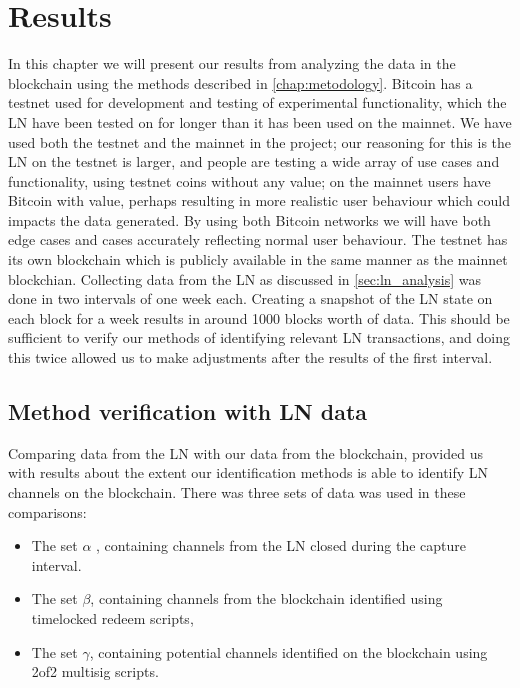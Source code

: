 \chapter{Results}
\label{chap:results}

In this chapter we will present our results from analyzing the data in the blockchain using the methods described in \cref{chap:metodology}. 
Bitcoin has a testnet used for development and testing of experimental functionality, which the LN have been tested on for longer than it has been used on the mainnet. We have used both the testnet and the mainnet in the project; our reasoning for this is the LN on the testnet is larger, and people are testing a wide array of use cases and functionality, using testnet coins without any value; on the mainnet users have Bitcoin with value, perhaps resulting in more realistic user behaviour which could impacts the data generated.
By using both Bitcoin networks we will have both edge cases and cases accurately reflecting normal user behaviour.
The testnet has its own blockchain which is publicly available in the same manner as the mainnet blockchian. Collecting data from the LN as discussed in \cref{sec:ln_analysis} was done in two intervals of one week each.
Creating a snapshot of the LN state on each block for a week results in around 1000 blocks worth of data. This should be sufficient to verify our methods of identifying relevant LN transactions, and doing this twice allowed us to make adjustments after the results of the first interval. 

\section{Method verification with LN data}
\label{sec:method_verification}

Comparing data from the LN with our data from the blockchain, provided us with results about the extent our identification methods is able to identify LN channels on the blockchain. There was three sets of data was used in these comparisons: 
\begin{itemize}
    \item The set \( \alpha \) , containing channels from the LN closed during the capture interval. 
    \item The set \( \beta \), containing channels from the blockchain identified using timelocked redeem scripts,
    \item The set  \( \gamma \), containing potential channels identified on the blockchain using 2of2 multisig scripts.
\end{itemize}

